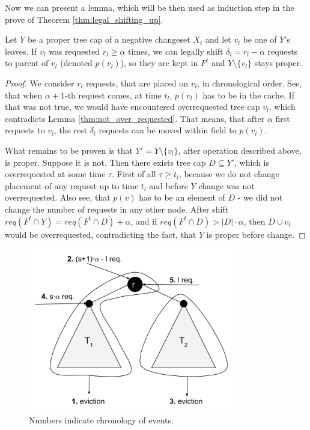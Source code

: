 Now we can present a lemma, which will be then used as induction step in the 
prove of Theorem \ref{thm:legal_shifting_up}.
\begin{lemma}
Let $Y$ be a proper tree cap of a negative changeset $X_t$ and let $v_l$ be one 
of $Y$'s leaves. If $v_l$ was requested $r_l \geq \alpha$ times, we can legally 
shift  $\delta_l = r_l - \alpha$ requests to parent of $v_l$ (denoted $p(v_l)$),
 so they are kept in $F^t$ and $Y \setminus \{v_l\}$ stays proper. 
\end{lemma}
\begin{proof}
We consider $r_l$ requests, that are placed on $v_l$, in chronological order. 
See, that when $\alpha + 1$-th request comes, at time $t_l$, $p(v_l)$ has to be
 in the cache. If that was not true, we would have encountered overrequested 
tree cap ${v_l}$, which contradicts Lemma \ref{thm:not_over_requested}. That 
means, that after $\alpha$ first requests to $v_l$, the rest $\delta_l$ requests
 can be moved within field to $p(v_l)$.

What remains to be proven is that $Y' = Y \setminus \{v_l\}$, after operation 
described above, is proper. Suppose it is not. Then there exists tree cap 
$D \subseteq Y'$, which is overrequested at some time $\tau$. First of all 
$\tau \geq t_l$, because we do not change placement of any request up to time 
$t_l$ and before $Y$ change was not overrequested. Also see, that $p(v)$ has to 
be an element of $D$ - we did not change the number of requests in any other 
node. After shift $req(F^t \cap Y) = req(F^t \cap D) + \alpha$, and if 
$req(F^t \cap D) > |D| \cdot \alpha$, then $D \cup v_l$ would be overrequested, 
contradicting the fact, that $Y$ is proper before change.
\end{proof}
\begin{figure}
 \begin{center}
  \includegraphics[width=0.8\textwidth]{example_not_even.png}
\end{center}
\caption{Numbers indicate chronology of events.}
\label{fig:example_not_even}
\end{figure}


